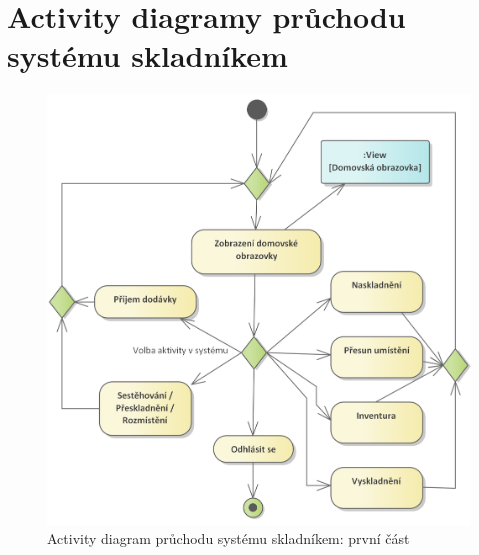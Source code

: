 \chapter{Activity diagramy průchodu systému skladníkem} \label{ap:diagram:storekeeper}

\begin{figure}[]
\includegraphics[width=\textwidth]{../png/diagrams/ac1.png}
\caption{Activity diagram průchodu systému skladníkem: první část} \label{picture:storekeeper1}
\end{figure}

